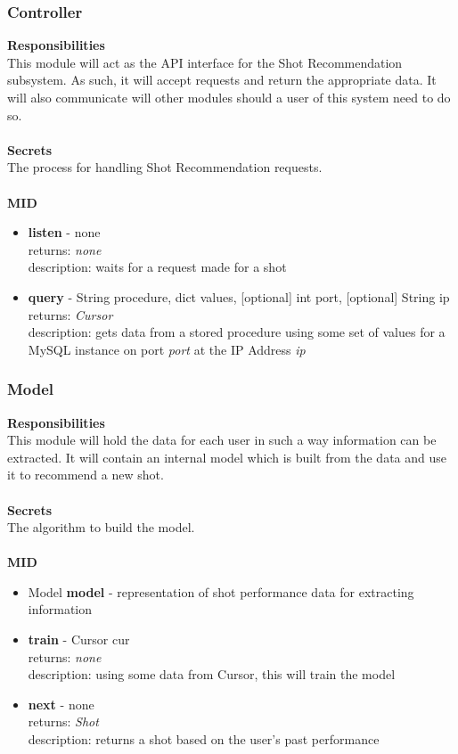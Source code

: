 \documentclass[11pt]{article}
\begin{document}
\subsubsection*{Controller}
\textbf{Responsibilities} \\
This module will act as the API interface for the Shot Recommendation subsystem. As such, it will accept requests and return the appropriate data. It will also communicate will other modules should a user of this system need to do so. \\ \\
\textbf{Secrets} \\
The process for handling Shot Recommendation requests. \\ \\
\textbf{MID}
\begin{itemize}
\item \textbf{listen} - none \\ returns: \textit{none} \\ description: waits for a request made for a shot
\item \textbf{query} - String procedure,  dict values, [optional] int port, [optional] String ip \\ returns: \textit{Cursor} \\ description: gets data from a stored procedure using some set of values for a MySQL instance on port \textit{port} at the IP Address \textit{ip}
\end{itemize}

\subsubsection*{Model}
\textbf{Responsibilities} \\
This module will hold the data for each user in such a way information can be extracted. It will contain an internal model which is built from the data and use it to recommend a new shot. \\ \\
\textbf{Secrets} \\
The algorithm to build the model. \\ \\
\textbf{MID}
\begin{itemize}
\item Model \textbf{model} - representation of shot performance data for extracting information
\item \textbf{train} - Cursor cur \\ returns: \textit{none} \\ description: using some data from Cursor, this will train the model
\item \textbf{next} - none \\ returns: \textit{Shot} \\ description: returns a shot based on the user's past performance
\end{itemize}
\end{document}
